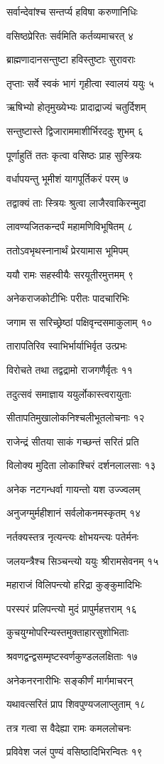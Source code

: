 सर्वान्देवांश्च सन्तर्प्य हविषा करुणानिधिः

वसिष्ठप्रेरितः सर्वमिति कर्तव्यमाचरत् ४

ब्राह्मणादानसन्तुष्टा हविस्तुष्टाः सुरावराः

तृप्ताः सर्वे स्वकं भागं गृहीत्वा स्वालयं ययुः ५

ऋषिभ्यो होतृमुख्येभ्यः प्रादाद्राज्यं चतुर्दिशम्

सन्तुष्टास्ते द्विजाराममाशीर्भिरददुः शुभम् ६

पूर्णाहुतिं ततः कृत्वा वसिष्ठः प्राह सुस्त्रियः

वर्धापयन्तु भूमीशं यागपूर्तिकरं परम् ७

तद्वाक्यं ताः स्त्रियः श्रुत्वा लाजैरवाकिरन्मुदा

लावण्यजितकन्दर्पं महामणिविभूषितम् ८

ततोऽवभृथस्नानार्थं प्रेरयामास भूमिपम्

ययौ रामः सहस्वीयैः सरयूतीरमुत्तमम् ९

अनेकराजकोटीभिः परीतः पादचारिभिः

जगाम स सरिच्छ्रेष्ठां पक्षिवृन्दसमाकुलाम् १०

तारापतिरिव स्वाभिर्भार्याभिर्वृत उत्प्रभः

विरोचते तथा तद्वद्रामो राजगणैर्वृतः ११

तदुत्सवं समाज्ञाय ययुर्लोकास्त्वरायुताः

सीतापतिमुखालोकनिश्चलीभूतलोचनाः १२

राजेन्द्रं सीतया साकं गच्छन्तं सरितं प्रति

विलोक्य मुदिता लोकाश्चिरं दर्शनलालसाः १३

अनेक नटगन्धर्वा गायन्तो यश उज्ज्वलम्

अनुजग्मुर्महीशानं सर्वलोकनमस्कृतम् १४

नर्तक्यस्तत्र नृत्यन्त्यः क्षोभयन्त्यः पतेर्मनः

जलयन्त्रैश्च सिञ्चन्त्यो ययुः श्रीरामसेवनम् १५

महाराजं विलिपन्त्यो हरिद्रा कुङ्कुमादिभिः

परस्परं प्रलिपन्त्यो मुदं प्रापुर्महत्तराम् १६

कुचयुग्मोपरिन्यस्तमुक्ताहारसुशोभिताः

श्रवणद्वन्द्वसम्मृष्टस्वर्णकुण्डललक्षिताः १७

अनेकनरनारीभिः सङ्कीर्णं मार्गमाचरन्

यथावत्सरितं प्राप शिवपुण्यजलाप्लुताम् १८

तत्र गत्वा स वैदेह्या रामः कमललोचनः

प्रविवेश जलं पुण्यं वसिष्ठादिभिरन्वितः १९

